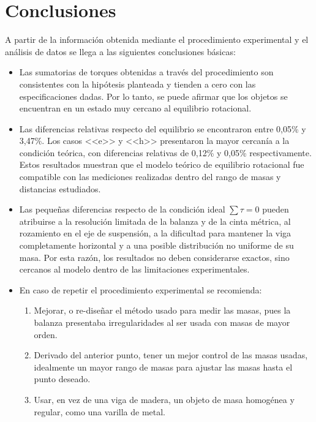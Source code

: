 \chapter{Conclusiones}
A partir de la información obtenida mediante el procedimiento experimental y el análisis de datos se llega a las siguientes conclusiones básicas:
\begin{itemize}
    \item Las sumatorias de torques obtenidas a través del procedimiento son consistentes con la hipótesis planteada y tienden a cero con las especificaciones dadas. Por lo tanto, se puede afirmar que los objetos se encuentran en un estado muy cercano al equilibrio rotacional.

    \item Las diferencias relativas respecto del equilibrio se encontraron entre 0,05\% y 3,47\%. Los casos <<e>> y <<h>> presentaron la mayor cercanía a la condición teórica, con diferencias relativas de 0,12\% y 0,05\% respectivamente. Estos resultados muestran que el modelo teórico de equilibrio rotacional fue compatible con las mediciones realizadas dentro del rango de masas y distancias estudiados.
    
    \item Las pequeñas diferencias respecto de la condición ideal $\sum \tau = 0$ pueden atribuirse a la resolución limitada de la balanza y de la cinta métrica, al rozamiento en el eje de suspensión, a la dificultad para mantener la viga completamente horizontal y a una posible distribución no uniforme de su masa. Por esta razón, los resultados no deben considerarse exactos, sino cercanos al modelo dentro de las limitaciones experimentales.
    
    \item En caso de repetir el procedimiento experimental se recomienda:
        \begin{enumerate}
            \item Mejorar, o re-diseñar el método usado para medir las masas, pues la balanza presentaba irregularidades al ser usada con masas de mayor orden.
            \item Derivado del anterior punto, tener un mejor control de las masas usadas, idealmente un mayor rango de masas para ajustar las masas hasta el punto deseado.
            \item Usar, en vez de una viga de madera, un objeto de masa homogénea y regular, como una varilla de metal.
        \end{enumerate}
\end{itemize}